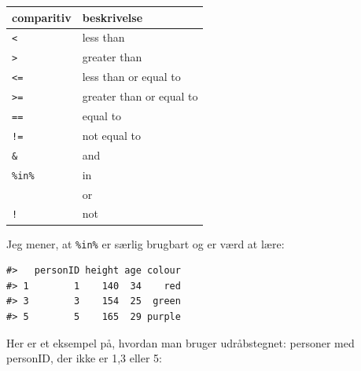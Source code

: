 \documentclass[
]{book}
\newenvironment{Shaded}{\begin{snugshade}}{\end{snugshade}}
\newcommand{\CommentTok}[1]{\textcolor[rgb]{0.37,0.37,0.37}{\textit{#1}}}
\newcommand{\DecValTok}[1]{\textcolor[rgb]{0.06,0.06,0.06}{#1}}
\newcommand{\FunctionTok}[1]{\textcolor[rgb]{0.27,0.27,0.27}{\textbf{#1}}}
\newcommand{\NormalTok}[1]{#1}
\newcommand{\SpecialCharTok}[1]{\textcolor[rgb]{0.43,0.43,0.43}{\textbf{#1}}}
\begin{document}
\begin{longtable}[]{@{}ll@{}}
\toprule\noalign{}
comparitiv & beskrivelse \\
\midrule\noalign{}
\endhead
\bottomrule\noalign{}
\endlastfoot
\texttt{\textless{}} & less than \\
\texttt{\textgreater{}} & greater than \\
\texttt{\textless{}=} & less than or equal to \\
\texttt{\textgreater{}=} & greater than or equal to \\
\texttt{==} & equal to \\
\texttt{!=} & not equal to \\
\texttt{\&} & and \\
\texttt{\%in\%} & in \\
\texttt{\textbar{}} & or \\
\texttt{!} & not \\
\end{longtable}

Jeg mener, at \texttt{\%in\%} er særlig brugbart og er værd at lære:

\begin{Shaded}
\end{Shaded}

\begin{verbatim}
#>   personID height age colour
#> 1        1    140  34    red
#> 3        3    154  25  green
#> 5        5    165  29 purple
\end{verbatim}

Her er et eksempel på, hvordan man bruger udråbstegnet: personer med personID, der ikke er 1,3 eller 5:

\begin{Shaded}
\end{Shaded}
\end{document}
